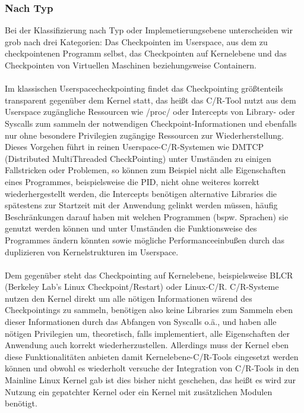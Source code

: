 \documentclass[a4paper]{article}
\begin{document}
\subsubsection{Nach Typ}
Bei der Klassifizierung nach Typ oder Implemetierungsebene unterscheiden wir grob nach drei Kategorien: Das Checkpointen im Userspace, aus dem zu checkpointenen Programm selbst, das Checkpointen auf Kernelebene und das Checkpointen von Virtuellen Maschinen beziehungsweise Containern.\\ \\
Im klassischen Userspacecheckpointing findet das Checkpointing größtenteils transparent gegenüber dem Kernel statt, das heißt das C/R-Tool nutzt aus dem Userspace zugängliche Ressourcen wie /proc/ oder Intercepts von Library- oder Syscalls zum sammeln der notwendigen Checkpoint-Informationen und ebenfalls nur ohne besondere Privilegien zugängige Ressourcen zur Wiederherstellung. 
Dieses Vorgehen führt in reinen Userspace-C/R-Systemen wie DMTCP (Distributed MultiThreaded CheckPointing) unter Umständen zu einigen Fallstricken oder Problemen, so können zum Beispiel nicht alle Eigenschaften eines Programmes, beispielsweise die PID, nicht ohne weiteres korrekt wiederhergestellt werden, die Intercepts benötigen alternative Libraries die spätestens zur Startzeit mit der Anwendung gelinkt werden müssen, häufig Beschränkungen darauf haben mit welchen Programmen (bspw. Sprachen) sie genutzt werden können und unter Umständen die Funktionsweise des Programmes ändern könnten sowie mögliche Performanceeinbußen durch das duplizieren von Kernelstrukturen im Userspace.\\ \\
Dem gegenüber steht das Checkpointing auf Kernelebene, beispielsweise BLCR (Berkeley Lab's Linux Checkpoint/Restart) oder Linux-C/R.
C/R-Systeme nutzen den Kernel direkt um alle nötigen Informationen wärend des Checkpointings zu sammeln, benötigen also keine Libraries zum Sammeln eben dieser Informationen durch das Abfangen von Syscalls o.ä., und haben alle nötigen Privilegien um, theoretisch, falls implementiert, alle Eigenschaften der Anwendung auch korrekt wiederherzustellen. Allerdings muss der Kernel eben diese Funktionalitäten anbieten damit Kernelebene-C/R-Tools eingesetzt werden können und obwohl es wiederholt versuche der Integration von C/R-Tools in den Mainline Linux Kernel gab ist dies bisher nicht geschehen, das heißt es wird zur Nutzung ein gepatchter Kernel oder ein Kernel mit zusätzlichen Modulen benötigt.\\
\end{document}
